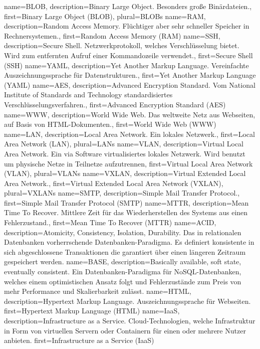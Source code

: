 {%
    name={BLOB},
    description={Binary Large Object. Besonders große Binärdateien.},
    first={Binary Large Object (BLOB)},
    plural={BLOBs}
}
{%
    name={RAM},
    description={Random Access Memory. Flüchtiger aber sehr schneller
    Speicher in Rechnersystemen.},
    first={Random Access Memory (RAM)}
}
{%
    name={SSH},
    description={Secure Shell. Netzwerkprotokoll, welches
    Verschlüsselung bietet. Wird zum entfernten Aufruf einer
    Kommandozeile verwendet.},
    first={Secure Shell (SSH)}
}
{%
    name={YAML},
    description={Yet Another Markup Language. Vereinfachte
    Auszeichnungssprache für Datenstrukturen.},
    first={Yet Another Markup Language (YAML)}
}
{%
    name={AES},
    description={Advanced Encryption Standard. Vom National Institute
    of Standards and Technology standardisiertes
    Verschlüsselungsverfahren.},
    first={Advanced Encryption Standard (AES)}
}
{%
    name={WWW},
    description={World Wide Web. Das weltweite Netz aus Webseiten, auf
    Basis von HTML-Dokumenten.},
    first={World Wide Web (WWW)}
}
{%
    name={LAN},
    description={Local Area Network. Ein lokales Netzwerk.},
    first={Local Area Network (LAN)},
    plural={LANs}
}
{%
    name={VLAN},
    description={Virtual Local Area Network. Ein via Software
    virtualisiertes lokales Netzwerk. Wird benutzt um physische Netze in
    Teilnetze aufzutrennen},
    first={Virtual Local Area Network (VLAN)},
    plural={VLANs}
}
{%
    name={VXLAN},
    description={Virtual Extended Local Area Network.},
    first={Virtual Extended Local Area Network (VXLAN)},
    plural={VXLANs}
}
{%
    name={SMTP},
    description={Simple Mail Transfer Protocol.},
    first={Simple Mail Transfer Protocol (SMTP)}
}
{%
    name={MTTR},
    description={Mean Time To Recover. Mittlere Zeit für das
    Wiederherstellen des Systems aus einen Fehlerzustand.},
    first={Mean Time To Recover (MTTR)}
}
{%
    name={ACID},
    description={Atomicity, Consistency, Isolation, Durability. Das in
    relationalen Datenbanken vorherrschende Datenbanken-Paradigma. Es
    definiert konsistente in sich abgeschlossene Transaktionen die
    garantiert über einen längeren Zeitraum gespeichert werden.}
}
{%
    name={BASE},
    description={Basically available, soft state, eventually consistent.
    Ein Datenbanken-Paradigma für NoSQL-Datenbanken, welches einem
    optimistischen Ansatz folgt und Fehlerzustände zum Preis von mehr
    Performance und Skalierbarkeit zulässt.}
}
{%
    name={HTML},
    description={Hypertext Markup Language. Auszeichnungssprache für
    Webseiten.}
    first={Hypertext Markup Language (HTML)}
}
{%
    name={IaaS},
    description={Infrastructure as a Service. Cloud-Technologien,
    welche Infrastruktur in Form von virtuellen Servern oder Containern für
    einen oder mehrere Nutzer anbieten.}
    first={Infrastructure as a Service (IaaS)}
}
